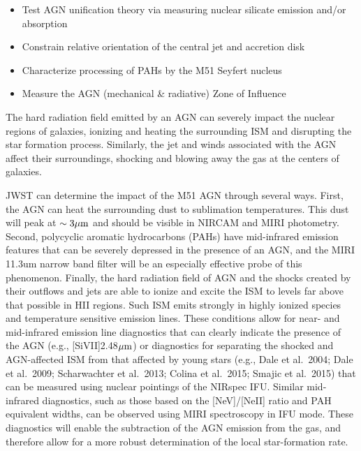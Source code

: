 \documentclass[12pt]{article}
\begin{document}

\begin{itemize}
    \item{Test AGN unification theory via measuring nuclear silicate emission and/or absorption}\vspace{-0.1in}
    \item{Constrain relative orientation of the central jet and accretion disk}\vspace{-0.1in}
    \item{Characterize processing of PAHs by the M51 Seyfert nucleus}\vspace{-0.1in}
    \item{Measure the AGN (mechanical \& radiative) Zone of Influence}
\end{itemize}

The hard radiation field emitted by an AGN can severely impact the nuclear regions of galaxies, ionizing and heating the surrounding ISM and disrupting the star formation process. Similarly, the jet and winds associated with the AGN affect their surroundings, shocking and blowing away the gas at the centers of galaxies.

JWST can determine the impact of the M51 AGN through several ways. First, the AGN can heat the surrounding dust to sublimation temperatures. This dust will peak at $\sim 3\hbox{$\mu$m}$ and should be visible in NIRCAM and MIRI photometry.  Second, polycyclic aromatic hydrocarbons (PAHs) have mid-infrared emission features that can be severely depressed in the presence of an AGN, and the MIRI 11.3um narrow band filter will be an especially effective probe of this phenomenon.  Finally, the hard radiation field of AGN and the shocks created by their outflows and jets are able to ionize and excite the ISM to levels far above that possible in HII regions. Such ISM emits strongly in highly ionized species and temperature sensitive emission lines. These conditions allow for near- and mid-infrared emission line diagnostics that can clearly indicate the presence of the AGN (e.g., [SiVII]2.48$\hbox{$\mu$m}$) or diagnostics for separating the shocked and AGN-affected ISM from that affected by young stars (e.g., Dale et al.\ 2004; Dale et al.\ 2009; Scharwachter et al.\ 2013; Colina et al.\ 2015; Smajic et al.\ 2015) that can be measured using nuclear pointings of the NIRspec IFU. Similar mid-infrared diagnostics, such as those based on the [NeV]/[NeII] ratio and PAH equivalent widths, can be observed using MIRI spectroscopy in IFU mode. These diagnostics will enable the subtraction of the AGN emission from the gas, and therefore allow for a more robust determination of the local star-formation rate.
\end{document}
